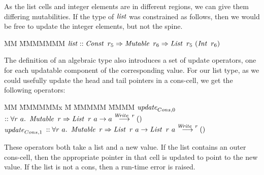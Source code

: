 As the list cells and integer elements are in different regions, we can give them differing mutabilities. If the type of $\operatorname{\mathit{list}}$ was constrained as follows, then we would be free to update the integer elements, but not the spine.

\begin{tabbing}
MM	\= MMMMMMM \kill
	\> $\operatorname{\mathit{list}} :: \operatorname{\mathit{Const}} \ r_5 \Rightarrow \operatorname{\mathit{Mutable}} \ r_6 \Rightarrow \operatorname{\mathit{List}} \ r_5 \ (\operatorname{\mathit{Int}} \ r_6)$
\end{tabbing}

The definition of an algebraic type also introduces a set of update operators, one for each updatable component of the corresponding value. For our list type, as we could usefully update the head and tail pointers in a cons-cell, we get the following operators:

\begin{tabbing}
MM \= MMMMMMx \= M \= MMMMM \= MMMM \kill
	\> $\operatorname{\mathit{update}}_{Cons, 0}$	
		\> $:: \forall r \ a. \ \operatorname{\mathit{Mutable}} \ r \Rightarrow \operatorname{\mathit{List}} \ r \ a \to a \stackrel{\operatorname{\mathit{Write}} \ r}{\longrightarrow} ()$ 
\\
	\> $\operatorname{\mathit{update}}_{Cons, 1}$	
		\> $:: \forall r \ a. \ \iMutable \ r \To \iList \ r \ a \to \iList \ r \ a \longtoa{\iWrite \ r} ()$
\end{tabbing}

These operators both take a list and a new value. If the list contains an outer cons-cell, then the appropriate pointer in that cell is updated to point to the new value. If the list is not a cons, then a run-time error is raised.

